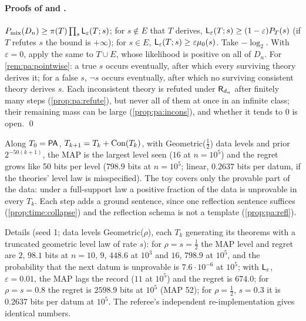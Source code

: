 \paragraph{Proofs of  and .} $P_{\mathrm{mix}}(D_n)\ge\pi(T)\prod_s\mathsf{L}_{\varepsilon}(T;s)$; for $s\notin E$ that $T$ derives, $\mathsf{L}_{\varepsilon}(T;s)\ge(1-\varepsilon)P_T(s)$ (if $T$ refutes $s$ the bound is $+\infty$); for $s\in E$, $\mathsf{L}_{\varepsilon}(T;s)\ge\varepsilon\mu_0(s)$. Take $-\log_2$. With $\varepsilon=0$, apply the same to $T\cup E$, whose likelihood is positive on all of $D_n$. For \cref{rem:pa:pointwise}: a true $s$ occurs eventually, after which every surviving theory derives it; for a false $s$, $\neg s$ occurs eventually, after which no surviving consistent theory derives $s$. Each inconsistent theory is refuted under $\mathsf{R}_{d_n}$ after finitely many steps (\cref{prop:pa:refute}), but never all of them at once in an infinite class; their remaining mass can be large (\cref{prop:pa:incons}), and whether it tends to $0$ is open. \qed

\begin{remark}\pabrk{}\label{rem:pa:tower}
Along $T_0=\mathsf{PA}$, $T_{k+1}=T_k+\mathrm{Con}(T_k)$, with Geometric($\frac12$) data levels and prior $2^{-50(k+1)}$, the MAP is the largest level seen ($16$ at $n=10^5$) and the regret grows like 50 bits per level ($798.9$ bits at $n=10^5$; linear, $0.2637$ bits per datum, if the theories' level law is misspecified). The toy covers only the provable part of the data: under a full-support law a positive fraction of the data is unprovable in every $T_k$. Each step adds a ground sentence, since one reflection sentence suffices (\cref{prop:time:collapse}) and the reflection schema is not a template (\cref{prop:pa:refl}).
\end{remark}

\noindent Details (seed 1; data levels Geometric($\rho$), each $T_k$ generating its theorems with a truncated geometric level law of rate $s$): for $\rho=s=\frac12$ the MAP level and regret are $2$, $98.1$ bits at $n=10$, $9$, $448.6$ at $10^3$ and $16$, $798.9$ at $10^5$, and the probability that the next datum is unprovable is $7.6\cdot10^{-6}$ at $10^5$; with $\mathsf{L}_{\varepsilon}$, $\varepsilon=0.01$, the MAP lags the record ($11$ at $10^5$) and the regret is $674.0$; for $\rho=s=0.8$ the regret is $2598.9$ bits at $10^5$ (MAP 52); for $\rho=\frac12$, $s=0.3$ it is $0.2637$ bits per datum at $10^5$. The referee's independent re-implementation gives identical numbers.

